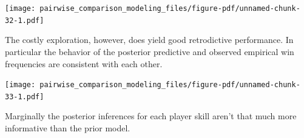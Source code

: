 \documentclass[
  letterpaper,
  DIV=11,
  numbers=noendperiod]{scrartcl}
\newenvironment{Shaded}{\begin{snugshade}}{\end{snugshade}}
\newcommand{\AttributeTok}[1]{\textcolor[rgb]{0.40,0.45,0.13}{#1}}
\newcommand{\ControlFlowTok}[1]{\textcolor[rgb]{0.00,0.23,0.31}{#1}}
\newcommand{\DecValTok}[1]{\textcolor[rgb]{0.68,0.00,0.00}{#1}}
\newcommand{\FunctionTok}[1]{\textcolor[rgb]{0.28,0.35,0.67}{#1}}
\newcommand{\NormalTok}[1]{\textcolor[rgb]{0.00,0.23,0.31}{#1}}
\newcommand{\OtherTok}[1]{\textcolor[rgb]{0.00,0.23,0.31}{#1}}
\newcommand{\SpecialCharTok}[1]{\textcolor[rgb]{0.37,0.37,0.37}{#1}}
\newcommand{\StringTok}[1]{\textcolor[rgb]{0.13,0.47,0.30}{#1}}
\begin{document}
\texttt{[image: pairwise\_comparison\_modeling\_files/figure-pdf/unnamed-chunk-32-1.pdf]}

The costly exploration, however, does yield good retrodictive
performance. In particular the behavior of the posterior predictive and
observed empirical win frequencies are consistent with each other.

\begin{Shaded}
\end{Shaded}

\texttt{[image: pairwise\_comparison\_modeling\_files/figure-pdf/unnamed-chunk-33-1.pdf]}

Marginally the posterior inferences for each player skill aren't that
much more informative than the prior model.
\end{document}
